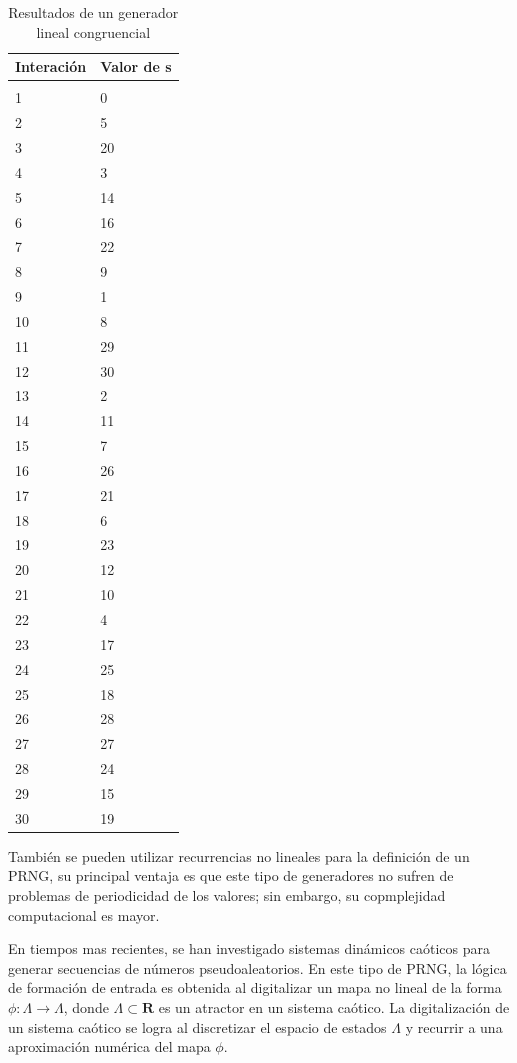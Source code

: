 \documentclass{llncs}
\begin{document}
\begin{table}[t]
\caption{Resultados de un generador lineal congruencial}
\label{sample-table}
\begin{center}
\begin{tabular}{ll}
\multicolumn{1}{c}{\bf Interación }  &\multicolumn{1}{c}{\bf Valor de s}
\\ \hline \\

1 &  0\\
2  & 5\\
3  & 20\\
4 &  3\\
5  & 14\\
6  & 16\\
7  & 22\\
8  & 9\\
9 &  1\\
10  & 8\\
11 &  29\\
12 & 30\\
13 & 2\\
14 & 11\\
15 & 7\\
16 & 26\\
17 & 21\\
18 & 6\\
19 & 23\\
20 & 12\\
21 & 10\\
22 & 4\\
23 & 17\\
24 & 25\\
25 & 18\\
26 & 28\\
27 & 27\\
28 & 24\\
29 & 15\\
30 & 19\\
\end{tabular}
\end{center}
\end{table}


También se pueden utilizar recurrencias no lineales para la definición de un PRNG, su principal ventaja es que este tipo de generadores no sufren de  problemas de periodicidad de los valores; sin embargo,  su copmplejidad computacional es mayor.

En tiempos mas recientes, se han investigado sistemas dinámicos caóticos para generar secuencias de números pseudoaleatorios. En este tipo de PRNG, la lógica de formación de entrada es obtenida al digitalizar un mapa no lineal de la forma $\phi:  \Lambda \longrightarrow \Lambda$, donde $\Lambda \subset \mathbf{R}$ es un atractor en un sistema caótico. La digitalización de un sistema caótico  se logra al discretizar el espacio de estados $\Lambda$ y recurrir a una aproximación numérica  del mapa $\phi$.
\end{document}
